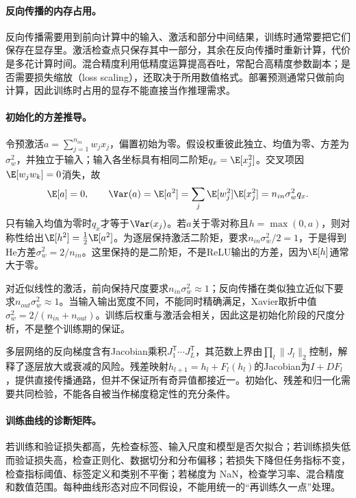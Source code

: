 \paragraph{反向传播的内存占用。}
反向传播需要用到前向计算中的输入、激活和部分中间结果，训练时通常要把它们保存在显存里。激活检查点只保存其中一部分，其余在反向传播时重新计算，代价是多花计算时间。混合精度利用低精度运算提高吞吐，常配合高精度参数副本；是否需要损失缩放（loss scaling），还取决于所用数值格式。部署预测通常只做前向计算，因此训练时占用的显存不能直接当作推理需求。

\paragraph{初始化的方差推导。}
令预激活$a=\sum_{j=1}^{n_{in}}w_jx_j$，偏置初始为零。假设权重彼此独立、均值为零、方差为$\sigma_w^2$，并独立于输入；输入各坐标具有相同二阶矩$q_x=\E[x_j^2]$。交叉项因$\E[w_jw_k]=0$消失，故
\begin{equation}
 \E[a]=0,\qquad \Var(a)=\E[a^2]
 =\sum_j\E[w_j^2]\E[x_j^2]=n_{in}\sigma_w^2q_x.
\end{equation}
只有输入均值为零时$q_x$才等于$\Var(x_j)$。若$a$关于零对称且$h=\max(0,a)$，则对称性给出$\E[h^2]=\tfrac12\E[a^2]$。为逐层保持激活二阶矩，要求$n_{in}\sigma_w^2/2=1$，于是得到He方差$\sigma_w^2=2/n_{in}$。这里保持的是二阶矩，不是ReLU输出的方差，因为$\E[h]$通常大于零。

对近似线性的激活，前向保持尺度要求$n_{in}\sigma_w^2\approx1$；反向传播在类似独立近似下要求$n_{out}\sigma_w^2\approx1$。当输入输出宽度不同，不能同时精确满足，Xavier取折中值$\sigma_w^2=2/(n_{in}+n_{out})$。训练后权重与激活会相关，因此这是初始化阶段的尺度分析，不是整个训练期的保证。

多层网络的反向梯度含有Jacobian乘积$J_1^{\mathsf T}\cdots J_L^{\mathsf T}$，其范数上界由$\prod_l\|J_l\|_2$控制，解释了逐层放大或衰减的风险。残差映射$h_{l+1}=h_l+F_l(h_l)$的Jacobian为$I+DF_l$，提供直接传播通路，但并不保证所有奇异值都接近一。初始化、残差和归一化需要共同检验，不能各自被当作梯度稳定性的充分条件。

\paragraph{训练曲线的诊断矩阵。}
若训练和验证损失都高，先检查标签、输入尺度和模型是否欠拟合；若训练损失低而验证损失高，检查正则化、数据切分和分布偏移；若损失下降但任务指标不变，检查指标阈值、标签定义和类别不平衡；若梯度为 NaN，检查学习率、混合精度和数值范围。每种曲线形态对应不同假设，不能用统一的“再训练久一点”处理。

